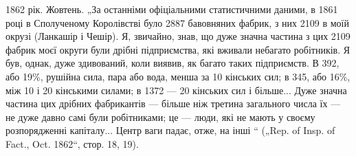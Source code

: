 1862 рік. Жовтень. „За останніми офіціальними статистичними
даними, в 1861 році в Сполученому Королівстві було 2887 бавовняних
фабрик, з них 2109 в моїй окрузі (Ланкашір і Чешір). Я, звичайно,
знав, що дуже значна частина з цих 2109 фабрик моєї округи
були дрібні підприємства, які вживали небагато робітників. Я
був, однак, дуже здивований, коли виявив, як багато таких підприємств.
В 392, або 19\%, рушійна сила, пара або вода, менша за
10 кінських сил; в 345, або 16\%, між 10 і 20 кінськими силами;
в 1372 — 20 кінських сил і більше... Дуже значна частина цих
дрібних фабрикантів — більше ніж третина загального числа їх —
не дуже давно самі були робітниками; це — люди, які не мають
у своєму розпорядженні капіталу... Центр ваги падає, отже, на
інші “ („Rep. of Insp. of Fact., Oct. 1862“, стор. 18, 19).
